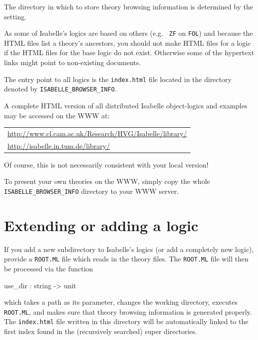 \medskip The directory in which to store theory browsing information
is determined by the  setting.

\medskip As some of Isabelle's logics are based on others (e.g. {\tt
  ZF} on {\tt FOL}) and because the HTML files list a theory's
ancestors, you should not make HTML files for a logic if the HTML
files for the base logic do not exist. Otherwise some of the hypertext
links might point to non-existing documents.

The entry point to all logics is the {\tt index.html} file located in
the directory denoted by \texttt{ISABELLE_BROWSER_INFO}.

A complete HTML version of all distributed Isabelle object-logics and
examples may be accessed on the WWW at:

\begin{center}\small
  \begin{tabular}{l}
    \url{http://www.cl.cam.ac.uk/Research/HVG/Isabelle/library/} \\
    \url{http://isabelle.in.tum.de/library/} \\
  \end{tabular}
\end{center}

Of course, this is not necessarily consistent with your local version!

To present your own theories on the WWW, simply copy the whole
\texttt{ISABELLE_BROWSER_INFO} directory to your WWW server.


\section{Extending or adding a logic}

If you add a new subdirectory to Isabelle's logics (or add a
completely new logic), provide a {\tt ROOT.ML} file which reads in the
theory files. The {\tt ROOT.ML} file will then be processed via the
function

\begin{ttbox}
use_dir : string -> unit
\end{ttbox}

which takes a path as its parameter, changes the working directory,
executes {\tt ROOT.ML}, and makes sure that theory browsing
information is generated properly. The {\tt index.html} file written
in this directory will be automatically linked to the first index
found in the (recursively searched) super directories.

